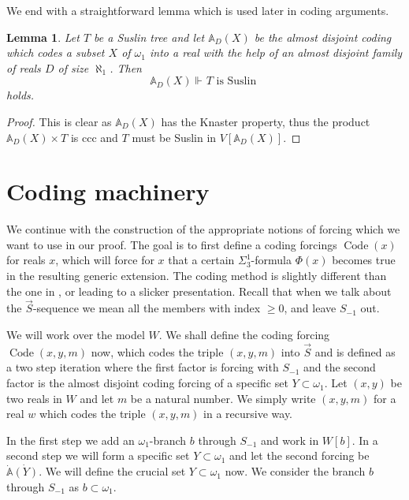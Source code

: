 \documentclass[a4paper,11pt]{article}
\newtheorem{lemma}[theorem]{Lemma}
\begin{document}
We end with a straightforward lemma which is used later in coding arguments.

\begin{lemma}\label{a.d.coding preserves Suslin trees}
 Let $T$ be a Suslin tree and let $\mathbb{A}_D(X)$ be the almost disjoint coding which codes
 a subset $X$ of $\omega_1$ into a real with the help of an almost disjoint family
 of reals $D$ of size $\aleph_1$. Then $$\mathbb{A}_{D}(X) \Vdash_{} T \text{ is Suslin }$$
 holds.
\end{lemma}
\begin{proof}
 This is clear as $\mathbb{A}_{D}(X)$ has the Knaster property, thus the product $\mathbb{A}_{D}(X) \times T$ is ccc and $T$ must be Suslin in $V[{\mathbb{A}_{D}(X)}]$. 
\end{proof}






\section{Coding machinery}
We continue with the construction of the appropriate notions of forcing which we want to use in our proof. The goal is to first define a coding forcings $\operatorname{Code} (x)$ for reals $x$, which will force for $x$ that a certain $\Sigma^1_3$-formula $\Phi(x)$ becomes true in the resulting generic extension. The coding method is slightly different than the one in  \cite{Ho2}, \cite{Ho3} or \cite{Ho4} leading to a slicker presentation. Recall that when we talk about the $\vec{S}$-sequence we mean all the members with index $\ge 0$, and leave $S_{-1}$ out.

We will work over the model $W$. We shall define the coding forcing $\operatorname{Code} (x,y,m)$ now, which codes the triple $(x,y,m)$ into $\vec{S}$ and is defined as a two step iteration where the first factor is forcing with $S_{-1}$ and the second factor is the almost disjoint coding forcing of a specific set $Y \subset \omega_1$. Let $(x,y)$ be two reals in $W$ and let $m$ be a natural number. We simply write $(x,y,m)$ for a real $w$ which codes the triple $(x,y,m)$ in a recursive way.

In the first step we add an $\omega_1$-branch $b$ through $S_{-1}$ and work in $W[b]$. In a second step we will form a specific set $Y \subset \omega_1$ and let the second forcing be $\dot{\mathbb{A}} \dot{(Y)}.$
We will define the crucial set $Y \subset \omega_1$ now. We consider the branch $b$ through $S_{-1}$ as  $b \subset \omega_1$. 
 
\end{document}
